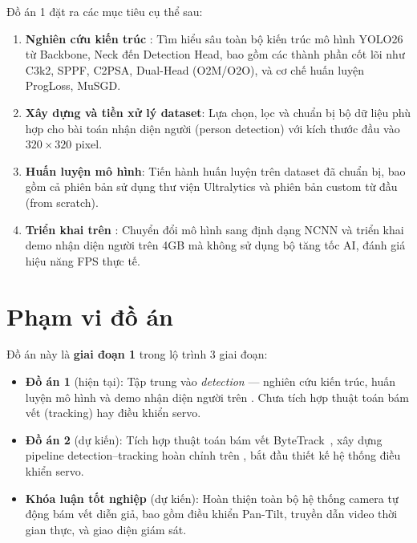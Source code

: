 Đồ án 1 đặt ra các mục tiêu cụ thể sau:

\begin{enumerate}[label=\arabic*)]
    \item \textbf{Nghiên cứu kiến trúc \yolo}: Tìm hiểu sâu toàn bộ kiến trúc mô hình YOLO26 từ Backbone, Neck đến Detection Head, bao gồm các thành phần cốt lõi như C3k2, SPPF, C2PSA, Dual-Head (O2M/O2O), và cơ chế huấn luyện ProgLoss, MuSGD.
    
    \item \textbf{Xây dựng và tiền xử lý dataset}: Lựa chọn, lọc và chuẩn bị bộ dữ liệu phù hợp cho bài toán nhận diện người (person detection) với kích thước đầu vào $320 \times 320$ pixel.
    
    \item \textbf{Huấn luyện mô hình}: Tiến hành huấn luyện \yolo trên dataset đã chuẩn bị, bao gồm cả phiên bản sử dụng thư viện Ultralytics và phiên bản custom từ đầu (from scratch).
    
    \item \textbf{Triển khai trên \rpi}: Chuyển đổi mô hình sang định dạng NCNN và triển khai demo nhận diện người trên \rpi 4GB mà không sử dụng bộ tăng tốc AI, đánh giá hiệu năng FPS thực tế.
\end{enumerate}

\section{Phạm vi đồ án}
\label{sec:intro_scope}

Đồ án này là \textbf{giai đoạn 1} trong lộ trình 3 giai đoạn:

\begin{itemize}
    \item \textbf{Đồ án 1} (hiện tại): Tập trung vào \textit{detection} --- nghiên cứu kiến trúc, huấn luyện mô hình và demo nhận diện người trên \rpi. Chưa tích hợp thuật toán bám vết (tracking) hay điều khiển servo.
    
    \item \textbf{Đồ án 2} (dự kiến): Tích hợp thuật toán bám vết ByteTrack~\cite{bytetrack}, xây dựng pipeline detection--tracking hoàn chỉnh trên \rpi, bắt đầu thiết kế hệ thống điều khiển servo.
    
    \item \textbf{Khóa luận tốt nghiệp} (dự kiến): Hoàn thiện toàn bộ hệ thống camera tự động bám vết diễn giả, bao gồm điều khiển Pan-Tilt, truyền dẫn video thời gian thực, và giao diện giám sát.
\end{itemize}

